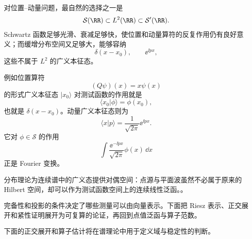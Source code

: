 对位置--动量问题，最自然的选择之一是
\[
\mathcal S(\RR)
\subset L^2(\RR)
\subset\mathcal S'(\RR).
\]
Schwartz 函数足够光滑、衰减足够快，使位置和动量算符的反复作用仍有良好意义；而缓增分布空间又足够大，能够容纳
\[
\delta(x-x_0),
\qquad
\ee^{\ii px},
\]
这些不属于 $L^2$ 的广义本征态。

例如位置算符
\[
(Q\psi)(x)=x\psi(x)
\]
的形式广义本征态 $|x_0\rangle$ 对测试函数的作用就是
\[
\langle x_0|\phi\rangle=\phi(x_0),
\]
也就是 $\delta(x-x_0)$。动量广义本征态则为
\[
\langle x|p\rangle
=\frac1{\sqrt{2\pi}}\ee^{\ii px}.
\]
它对 $\phi\in\mathcal S$ 的作用
\[
\int\frac{\ee^{-\ii px}}{\sqrt{2\pi}}\phi(x)\,\dd x
\]
正是 Fourier 变换。

分布理论为连续谱中的广义态提供对偶空间：点源与平面波虽然不必属于原来的 Hilbert 空间，却可以作为测试函数空间上的连续线性泛函。。


完备性和投影的条件决定了哪些测量可以由向量表示。下面把 Riesz 表示、正交展开和紧性证明展开为可复算的论证，再回到点值泛函与算子范数。



下面的正交展开和算子估计将在谱理论中用于定义域与稳定性的判断。


